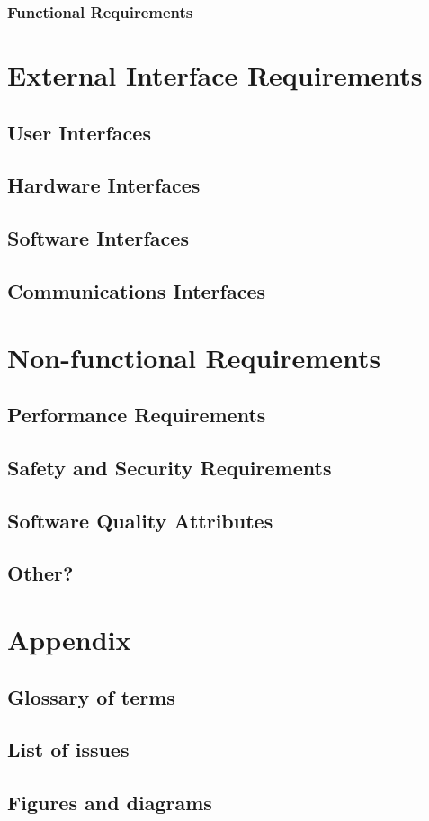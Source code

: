 \documentclass[a4paper,12pt]{article}
\begin{document}
\subsubsection{Functional Requirements}

\section{External Interface Requirements}
\subsection{User Interfaces}
\subsection{Hardware Interfaces}
\subsection{Software Interfaces}
\subsection{Communications Interfaces}

\section{Non-functional Requirements} 
\subsection{Performance Requirements}
\subsection{Safety and Security Requirements}
\subsection{Software Quality Attributes}
\subsection{Other?}

\section{Appendix}
\subsection{Glossary of terms}
\subsection{List of issues}
\subsection{Figures and diagrams}
\end{document}

